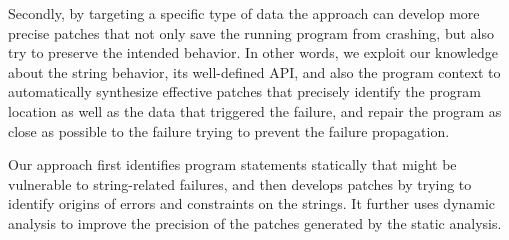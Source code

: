 Secondly, by targeting a specific type of data
the approach can develop more precise patches that not only save the running program from crashing, but 
also try to preserve the intended behavior. In other words, we exploit our
knowledge about the string behavior, its well-defined API, and also the program context to automatically synthesize 
effective patches that precisely identify the program location as well as the data that triggered the failure, and 
repair the program as close as possible to the failure trying to prevent the failure propagation.

Our approach first identifies program statements statically
that might be vulnerable to string-related failures, and then develops patches
by trying to identify origins of errors and constraints on the strings. It further uses dynamic
analysis to improve the precision of the patches generated by the static
analysis. 


